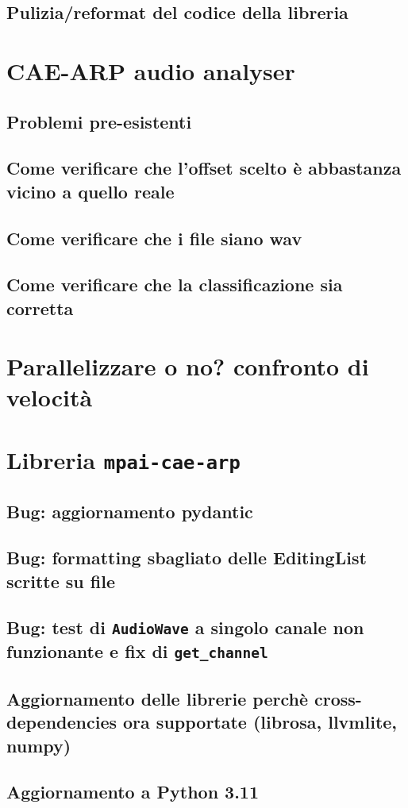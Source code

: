 \subsection{Pulizia/reformat del codice della libreria} %
\section{\acs{CAE}-\acs{ARP} audio analyser}
\subsection{Problemi pre-esistenti} %
\subsection{Come verificare che l'offset scelto è abbastanza vicino a quello reale} %
\subsection{Come verificare che i file siano wav}   %
\subsection{Come verificare che la classificazione sia corretta}    %
\section{Parallelizzare o no? confronto di velocità} \label{sec:parallelizzazione}
\section{Libreria \texttt{mpai-cae-arp}}    %
\subsection{Bug: aggiornamento pydantic}    %
\subsection{Bug: formatting sbagliato delle EditingList scritte su file}
\subsection{Bug: test di \texttt{AudioWave} a singolo canale non funzionante e fix di \texttt{get\_channel}}
\subsection{Aggiornamento delle librerie perchè cross-dependencies ora supportate (librosa, llvmlite, numpy)}
\subsection{Aggiornamento a Python 3.11} \label{ssec:py-311}
